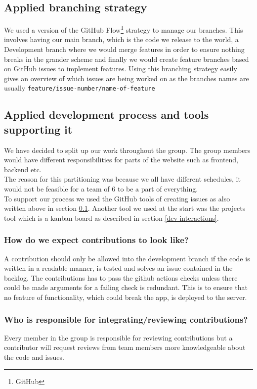\documentclass{article}
\begin{document}
\subsection{Applied branching strategy}
\label{applied-strategy}
We used a version of the GitHub Flow\footnote{GitHub} strategy to manage our branches. This involves having our main branch, which is the code we release to the world, a Development branch where we would merge features in order to ensure nothing breaks in the grander scheme and finally we would create feature branches based on GitHub issues to implement features.
Using this branching strategy easily gives an overview of which issues are being worked on as the branches names are usually \verb|feature/issue-number/name-of-feature|

\subsection{Applied development process and tools supporting it}
We have decided to split up our work throughout the group. The group members would have different responsibilities for parts of the website such as frontend, backend etc. \\
The reason for this partitioning was because we all have different schedules, it would not be feasible for a team of 6 to be a part of everything. \\

To support our process we used the GitHub tools of creating issues as also written above in section \ref{applied-strategy}. Another tool we used at the start was the projects tool which is a kanban board as described in section \ref{dev-interactions}.

\subsubsection{How do we expect contributions to look like?} 
A contribution should only be allowed into the development branch if the code is written in a readable manner, is tested and solves an issue contained in the backlog. The contributions has to pass the github actions checks unless there could be made arguments for a failing check is redundant. This is to ensure that no feature of functionality, which could break the app, is deployed to the server.

\subsubsection{Who is responsible for integrating/reviewing contributions?}
Every member in the group is responsible for reviewing contributions but a contributor will request reviews from team members more knowledgeable about the code and issues.
\end{document}
